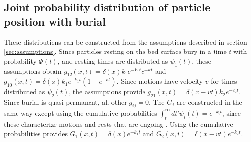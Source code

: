 \subsection{Joint probability distribution of particle position with burial}
\label{sec:solution}

These distributions can be constructed from the assumptions described in section \ref{sec:assumptions}.
Since particles resting on the bed surface bury in a time $t$ with probability $\Phi(t)$, and resting times are distributed as $\psi_1(t)$, these assumptions obtain $g_{12}(x,t) = \delta(x)k_1e^{-k_1t}e^{-\kappa t}$ and $g_{10}(x,t) = \delta(x) k_1 e^{-k_1 t}(1-e^{-\kappa t})$. Since motions have velocity $v$ for times distributed as $\psi_2(t)$, the assumptions provide $g_{21}(x,t) = \delta(x-vt)k_2e^{-k_2 t}$.
Since burial is quasi-permanent, all other $g_{ij} = 0$.
The $G_i$ are constructed in the same way except using the cumulative probabilities $\int_t^\infty dt'\psi_i(t) = e^{-k_i t}$, since these characterize motions and rests that are ongoing \citep{Weiss1994}.
Using the cumulative probabilities provides $G_1(x,t) = \delta(x)e^{-k_1t}$ and $G_2(x,t) = \delta(x-vt)e^{-k_2 t}$.

